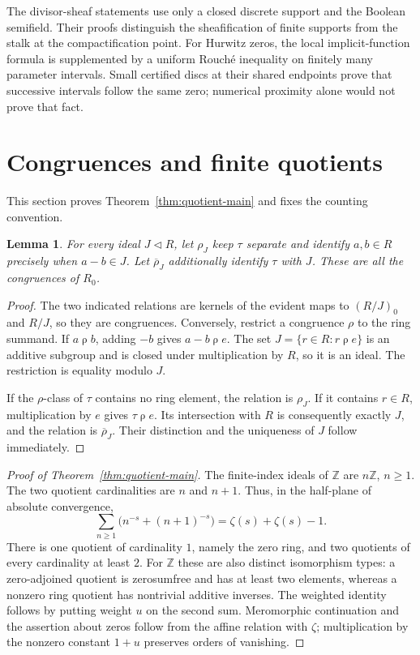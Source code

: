 \documentclass[11pt]{article}
\newcommand{\Z}{\mathbb Z}\newcommand{\N}{\mathbb N}\newcommand{\Q}{\mathbb Q}
\newtheorem{lemma}[theorem]{Lemma}
\theoremstyle{definition}\newtheorem{definition}[theorem]{Definition}
\begin{document}
The divisor-sheaf statements use only a closed discrete support and the Boolean semifield. Their proofs distinguish the sheafification of finite supports from the stalk at the compactification point. For Hurwitz zeros, the local implicit-function formula is supplemented by a uniform Rouch\'e inequality on finitely many parameter intervals. Small certified discs at their shared endpoints prove that successive intervals follow the same zero; numerical proximity alone would not prove that fact.

\section{Congruences and finite quotients}
This section proves Theorem~\ref{thm:quotient-main} and fixes the counting convention.

\begin{lemma}\label{lem:congruences}
For every ideal $J\lhd R$, let $\rho_J$ keep $\tau$ separate and identify $a,b\in R$ precisely when $a-b\in J$. Let $\overline\rho_J$ additionally identify $\tau$ with $J$. These are all the congruences of $R_0$.
\end{lemma}
\begin{proof}
The two indicated relations are kernels of the evident maps to $(R/J)_0$ and $R/J$, so they are congruences. Conversely, restrict a congruence $\rho$ to the ring summand. If $a\mathrel\rho b$, adding $-b$ gives $a-b\mathrel\rho e$. The set $J=\{r\in R:r\mathrel\rho e\}$ is an additive subgroup and is closed under multiplication by $R$, so it is an ideal. The restriction is equality modulo $J$.

If the $\rho$-class of $\tau$ contains no ring element, the relation is $\rho_J$. If it contains $r\in R$, multiplication by $e$ gives $\tau\mathrel\rho e$. Its intersection with $R$ is consequently exactly $J$, and the relation is $\overline\rho_J$. Their distinction and the uniqueness of $J$ follow immediately.
\end{proof}

\begin{proof}[Proof of Theorem~\ref{thm:quotient-main}]
The finite-index ideals of $\Z$ are $n\Z$, $n\ge1$. The two quotient cardinalities are $n$ and $n+1$. Thus, in the half-plane of absolute convergence,
\[
 \sum_{n\ge1}\bigl(n^{-s}+(n+1)^{-s}\bigr)
 =\zeta(s)+\zeta(s)-1.
\]
There is one quotient of cardinality $1$, namely the zero ring, and two quotients of every cardinality at least $2$. For $\Z$ these are also distinct isomorphism types: a zero-adjoined quotient is zerosumfree and has at least two elements, whereas a nonzero ring quotient has nontrivial additive inverses. The weighted identity follows by putting weight $u$ on the second sum. Meromorphic continuation and the assertion about zeros follow from the affine relation with $\zeta$; multiplication by the nonzero constant $1+u$ preserves orders of vanishing.
\end{proof}
\end{document}
